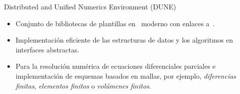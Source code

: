 \begin{frame}
\begin{alertblock}{Distributed and Unified Numerics Environment (DUNE)}
\begin{itemize}
			\item

			      Conjunto de \alert{bibliotecas de plantillas}
			      en~\cpplogo{} moderno con enlaces
			      a~\href{https://pypi.org/search/?q=dune-}{\pythonlogo{}}.


			\item

			      \alert{Implementación eficiente} de las estructuras
			      de datos y los algoritmos en interfaces abstractas.

			\item

			      Para la resolución numérica de
			      \alert{ecuaciones diferenciales parciales} e
			      implementación de esquemas basados en mallas, por
			      ejemplo, \emph{diferencias finitas},
			      \emph{elementos finitos} o
			      \emph{volúmenes finitos}.
		\end{itemize}
	\end{alertblock}


\end{frame}
